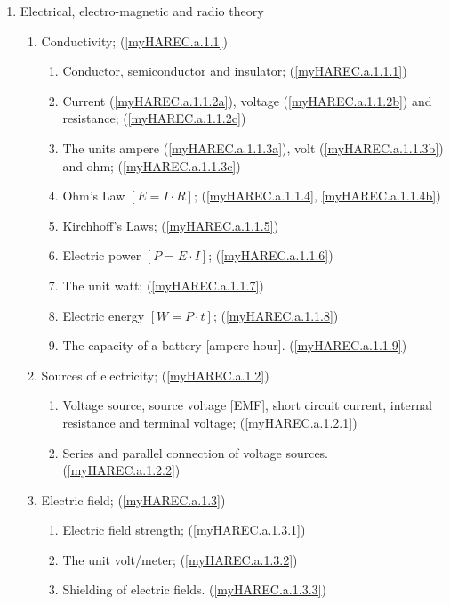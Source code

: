 \renewcommand{\theenumiv}{\arabic{enumiv}}
\renewcommand{\labelenumiv}{\theenumi.\theenumii.\theenumiii.\theenumiv}
\renewcommand{\p@enumiv}{\theenumi.\theenumii.\theenumiii.}
\makeatother

\begin{enumerate}
\item Electrical, electro-magnetic and radio theory
\begin{enumerate}

\item Conductivity; (\ref{myHAREC.a.1.1})\label{HAREC.a.1.1}
\begin{enumerate}
\item Conductor, semiconductor and insulator; (\ref{myHAREC.a.1.1.1})\label{HAREC.a.1.1.1}
\item Current (\ref{myHAREC.a.1.1.2a}), voltage (\ref{myHAREC.a.1.1.2b}) and resistance; (\ref{myHAREC.a.1.1.2c})\label{HAREC.a.1.1.2}
\item The units ampere (\ref{myHAREC.a.1.1.3a}), volt (\ref{myHAREC.a.1.1.3b}) and ohm; (\ref{myHAREC.a.1.1.3c})\label{HAREC.a.1.1.3}
\item Ohm's Law  \(\left[E = I \cdot R\right]\); (\ref{myHAREC.a.1.1.4}, \ref{myHAREC.a.1.1.4b})\label{HAREC.a.1.1.4}
\item Kirchhoff's Laws; (\ref{myHAREC.a.1.1.5})\label{HAREC.a.1.1.5}
\item Electric power \(\left[P = E \cdot I\right]\); (\ref{myHAREC.a.1.1.6})\label{HAREC.a.1.1.6}
\item The unit watt; (\ref{myHAREC.a.1.1.7})\label{HAREC.a.1.1.7}
\item Electric energy \(\left[W = P \cdot t\right]\); (\ref{myHAREC.a.1.1.8})\label{HAREC.a.1.1.8}
\item The capacity of a battery [ampere-hour]. (\ref{myHAREC.a.1.1.9})\label{HAREC.a.1.1.9}
\end{enumerate}

\item Sources of electricity; (\ref{myHAREC.a.1.2})\label{HAREC.a.1.2}
\begin{enumerate}
\item Voltage source, source voltage [EMF], short circuit current, internal resistance and terminal voltage; (\ref{myHAREC.a.1.2.1})\label{HAREC.a.1.2.1}
\item Series and parallel connection of voltage sources. (\ref{myHAREC.a.1.2.2})\label{HAREC.a.1.2.2}
\end{enumerate}

\item Electric field; (\ref{myHAREC.a.1.3})\label{HAREC.a.1.3}
\begin{enumerate}
\item Electric field strength; (\ref{myHAREC.a.1.3.1})\label{HAREC.a.1.3.1}
\item The unit volt/meter; (\ref{myHAREC.a.1.3.2})\label{HAREC.a.1.3.2}
\item Shielding of electric fields. (\ref{myHAREC.a.1.3.3})\label{HAREC.a.1.3.3}
\end{enumerate}


\end{enumerate}
\end{enumerate}
